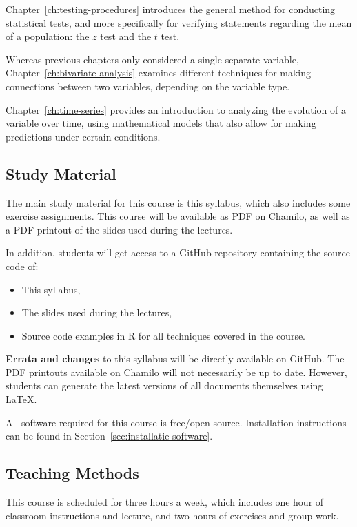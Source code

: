 Chapter~\ref{ch:testing-procedures} introduces the general method for conducting statistical tests, and more specifically for verifying statements regarding the mean of a population: the $ z $ test and the $ t $ test.

Whereas previous chapters only considered a single separate variable, Chapter~\ref{ch:bivariate-analysis} examines different techniques for making connections between two variables, depending on the variable type.

Chapter~\ref{ch:time-series} provides an introduction to analyzing the evolution of a variable over time, using mathematical models that also allow for making predictions under certain conditions.

\subsection{Study Material}

The main study material for this course is this syllabus, which also includes some exercise assignments. 
This course will be available as PDF on Chamilo, as well as a PDF printout of the slides used during the lectures.

In addition, students will get access to a GitHub repository containing the source code of:

\begin{itemize}
    \item This syllabus,
    \item The slides used during the lectures,
    \item Source code examples in R for all techniques covered in the course.
\end{itemize}

\textbf{Errata and changes} to this syllabus will be directly available on GitHub.
The PDF printouts available on Chamilo will not necessarily be up to date.
However, students can generate the latest versions of all documents themselves using \LaTeX{}.

All software required for this course is free/open source.
Installation instructions can be found in Section~\ref{sec:installatie-software}.

\subsection{Teaching Methods}

This course is scheduled for three hours a week, which includes one hour of classroom instructions and lecture, and two hours of exercises and group work.


